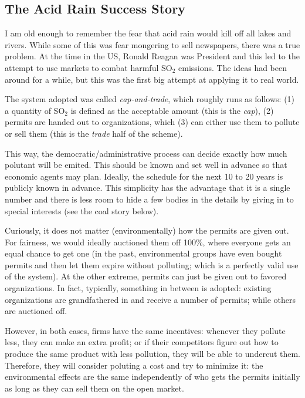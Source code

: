 \subsection{The Acid Rain Success Story}

I am old enough to remember the fear that acid rain would kill off all lakes
and rivers. While some of this was fear mongering to sell newspapers, there was
a true problem. At the time in the US, Ronald Reagan was President and this led
to the attempt to use markets to combat harmful SO${}_2$ emissions. The ideas
had been around for a while, but this was the first big attempt at applying it
to real world.

The system adopted was called \emph{cap-and-trade}, which roughly runs as
follows: (1) a quantity of SO${}_2$ is defined as the acceptable amount (this
is the \emph{cap}), (2) permits are handed out to organizations, which (3) can
either use them to pollute or sell them (this is the \emph{trade} half of the
scheme).

This way, the democratic/administrative process can decide exactly how much
polutant will be emited. This should be known and set well in advance so that
economic agents may plan. Ideally, the schedule for the next 10 to 20 years
is publicly known in advance. This simplicity has the advantage that it is a
single number and there is less room to hide a few bodies in the details by
giving in to special interests (see the coal story below).

Curiously, it does not matter (environmentally) how the permits are given out.
For fairness, we would ideally auctioned them off 100\%, where everyone gets an
equal chance to get one (in the past, environmental groups have even bought
permits and then let them expire without polluting; which is a perfectly valid
use of the system). At the other extreme, permits can just be given out to
favored organizations. In fact, typically, something in between is adopted:
existing organizations are grandfathered in and receive a number of permits;
while others are auctioned off.

However, in both cases, firms have the same incentives: whenever they pollute
less, they can make an extra profit; or if their competitors figure out how to
produce the same product with less pollution, they will be able to undercut
them. Therefore, they will consider poluting a cost and try to minimize it: the
environmental effects are the same independently of who gets the permits
initially as long as they can sell them on the open market.

